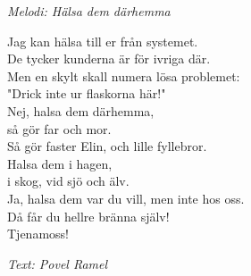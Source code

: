 {\footnotesize\textit{Melodi: Hälsa dem därhemma}}\par
\vspace{10pt}
Jag kan hälsa till er från systemet.\\
De tycker kunderna är för ivriga där.\\
Men en skylt skall numera lösa problemet:\\
"Drick inte ur flaskorna här!"\\
Nej, halsa dem därhemma,\\
så gör far och mor.\\
Så gör faster Elin, och lille fyllebror.\\
Halsa dem i hagen,\\
i skog, vid sjö och älv.\\
Ja, halsa dem var du vill, men inte hos oss.\\
Då får du hellre bränna själv!\\
Tjenamoss!\par
\vspace{10pt}
{\footnotesize\textit{Text: Povel Ramel}}
